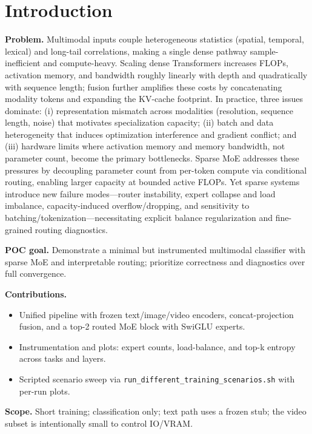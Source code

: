 \documentclass[11pt,a4paper]{article}
\begin{document}
\section{Introduction}
\textbf{Problem.} Multimodal inputs couple heterogeneous statistics (spatial, temporal, lexical) and long-tail correlations, making a single dense pathway sample-inefficient and compute-heavy. Scaling dense Transformers increases FLOPs, activation memory, and bandwidth roughly linearly with depth and quadratically with sequence length; fusion further amplifies these costs by concatenating modality tokens and expanding the KV-cache footprint. In practice, three issues dominate: (i) representation mismatch across modalities (resolution, sequence length, noise) that motivates specialization capacity; (ii) batch and data heterogeneity that induces optimization interference and gradient conflict; and (iii) hardware limits where activation memory and memory bandwidth, not parameter count, become the primary bottlenecks. Sparse MoE addresses these pressures by decoupling parameter count from per-token compute via conditional routing, enabling larger capacity at bounded active FLOPs. Yet sparse systems introduce new failure modes—router instability, expert collapse and load imbalance, capacity-induced overflow/dropping, and sensitivity to batching/tokenization—necessitating explicit balance regularization and fine-grained routing diagnostics.

\textbf{POC goal.} Demonstrate a minimal but instrumented multimodal classifier with sparse MoE and interpretable routing; prioritize correctness and diagnostics over full convergence.

\textbf{Contributions.}
\begin{itemize}[leftmargin=*]
  \item Unified pipeline with frozen text/image/video encoders, concat-projection fusion, and a top-2 routed MoE block with SwiGLU experts.
  \item Instrumentation and plots: expert counts, load-balance, and top-k entropy across tasks and layers.
  \item Scripted scenario sweep via \texttt{run\_different\_training\_scenarios.sh} with per-run plots.
\end{itemize}

\textbf{Scope.} Short training; classification only; text path uses a frozen stub; the video subset is intentionally small to control IO/VRAM.
\end{document}
